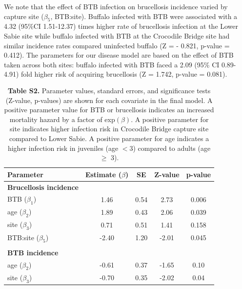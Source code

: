 \documentclass[10pt,letterpaper]{article}
\begin{document}
 We note that the effect of BTB infection on brucellosis incidence varied by capture site ($\beta_5$, BTB:site). Buffalo infected with BTB were associated with a 4.32 (95\%CI 1.51-12.37) times higher rate of brucellosis infection at the Lower Sabie site while buffalo infected with BTB at the Crocodile Bridge site had similar incidence rates compared uninfected buffalo (Z = - 0.821, p-value = 0.412). The parameters for our disease model are based on the effect of BTB taken across both sites: buffalo infected with BTB faced a 2.09 (95\% CI 0.89-4.91) fold higher risk of acquiring brucellosis (Z = 1.742, p-value = 0.081).

\begin{table}[ht]
\centering
\caption*{\textbf{Table S2.} Parameter values, standard errors, and significance tests (Z-value, p-values) are shown for each covariate in the final model. A positive parameter value for BTB or brucellosis indicates an increased mortality hazard by a factor of exp$(\beta)$. A positive parameter for site indicates higher infection risk in Crocodile Bridge capture site compared to Lower Sabie. A positive parameter for age indicates a higher infection risk in juveniles (age $<3$) compared to adults (age $\geq$ 3). }
\newcommand{\head}[1]{\textnormal{\textbf{#1}}}
\normalsize
\begin{tabular}{lcccc} 
\hline
\head{Parameter     } & \head{     Estimate ($\beta$)     } & \head{     SE     } & \head{     Z-value     } & \head{     p-value     } \\*
\hline
\textbf{Brucellosis incidence} & & & & \\
BTB ($\beta_1$) & 1.46 & 0.54 & 2.73 & 0.006 \\
age ($\beta_2$) & 1.89 & 0.43 & 2.06 & 0.039\\
site ($\beta_3$) & 0.71 & 0.51 & 1.41 & 0.158 \\
BTB:site ($\beta_5$) & -2.40 & 1.20 & -2.01 & 0.045 \\
 & & & & \\
\textbf{BTB incidence}  & & & & \\
age ($\beta_2$) & -0.61 & 0.37 & -1.65 & 0.10 \\
site ($\beta_3$) & -0.70 & 0.35 & -2.02 & 0.04\\
\hline 
\end{tabular}
\end{table} 
\end{document}
